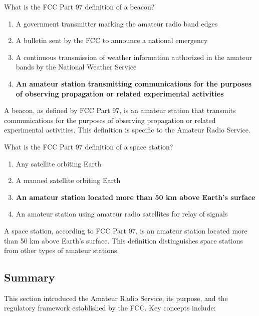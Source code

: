 
\begin{tcolorbox}[colback=gray!10!white,colframe=black!75!black,title={T1A06}]
    What is the FCC Part 97 definition of a beacon?
    \begin{enumerate}[label=\Alph*,noitemsep]
        \item A government transmitter marking the amateur radio band edges
        \item A bulletin sent by the FCC to announce a national emergency
        \item A continuous transmission of weather information authorized in the amateur bands by the National Weather Service
        \item \textbf{An amateur station transmitting communications for the purposes of observing propagation or related experimental activities}
    \end{enumerate}
\end{tcolorbox}
A beacon, as defined by FCC Part 97, is an amateur station that transmits communications for the purposes of observing propagation or related experimental activities. This definition is specific to the Amateur Radio Service.


\begin{tcolorbox}[colback=gray!10!white,colframe=black!75!black,title={T1A07}]
    What is the FCC Part 97 definition of a space station?
    \begin{enumerate}[label=\Alph*,noitemsep]
        \item Any satellite orbiting Earth
        \item A manned satellite orbiting Earth
        \item \textbf{An amateur station located more than 50 km above Earth's surface}
        \item An amateur station using amateur radio satellites for relay of signals
    \end{enumerate}
\end{tcolorbox}
A space station, according to FCC Part 97, is an amateur station located more than 50 km above Earth's surface. This definition distinguishes space stations from other types of amateur stations.


\subsection*{Summary}
This section introduced the Amateur Radio Service, its purpose, and the regulatory framework established by the FCC. Key concepts include:

